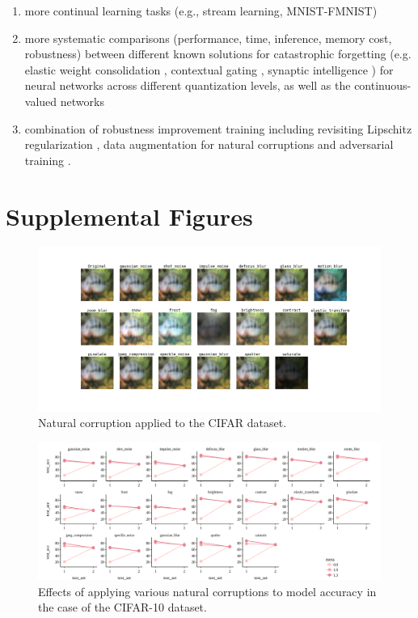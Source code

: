 \documentclass[manuscript,screen,review=false, nonacm]{acmart}
\begin{document}
\begin{enumerate}
    \item more continual learning tasks (e.g., stream learning, MNIST-FMNIST) \cite{Farquhar2018-zz,Van_de_Ven2019-xl,Laborieux_Ernoult_Hirtzlin_Querlioz_2021}
    \item more systematic comparisons (performance, time, inference, memory cost, robustness) between different known solutions for catastrophic forgetting (e.g. elastic weight consolidation \cite{Kirkpatrick2017-pe}, contextual gating \cite{Masse2018-ms}, synaptic intelligence \cite{Zenke2017-zl}) for neural networks across different quantization levels, as well as the continuous-valued networks
    \item combination of robustness improvement training including revisiting Lipschitz regularization \cite{Lin_2019}, data augmentation for natural corruptions and adversarial training \cite{Madry2017-dx}. 
\end{enumerate}




\setcounter{figure}{0}
\renewcommand{\thefigure}{S\arabic{figure}}

\section{Supplemental Figures}
\begin{figure}[ht]
    \centering
    \includegraphics[width=1.1\textwidth]{figures/report/FigS1.png}
    \caption{Natural corruption applied to the CIFAR dataset.}
    \label{fig:supp1}
\end{figure}


\begin{figure}[ht]
    \centering
    \includegraphics[width=1.1\textwidth]{figures/report/FigS2.png}
    \caption{Effects of applying various natural corruptions to model accuracy in the case of the CIFAR-10 dataset.}
    \label{fig:supp2}
\end{figure}
\end{document}
